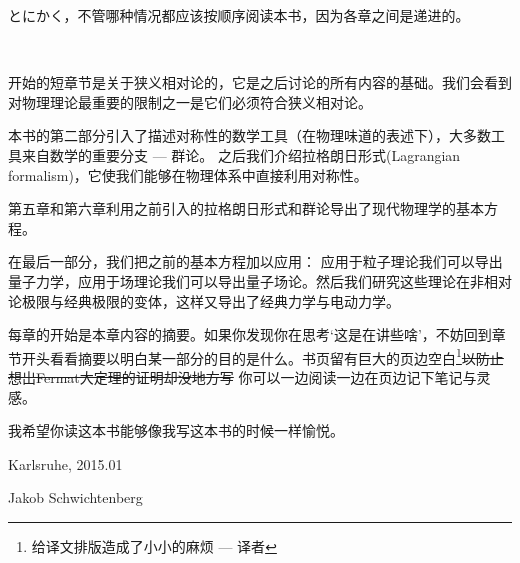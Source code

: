 とにかく，不管哪种情况都应该按顺序阅读本书，因为各章之间是递进的。

\ 

开始的短章节是关于狭义相对论的，它是之后讨论的所有内容的基础。我们会看到对物理理论最重要的限制之一是它们必须符合狭义相对论。 

本书的第二部分引入了描述对称性的数学工具（在物理味道的表述下），大多数工具来自数学的重要分支 --- 群论。 之后我们介绍拉格朗日形式(Lagrangian formalism)，它使我们能够在物理体系中直接利用对称性。 

第五章和第六章利用之前引入的拉格朗日形式和群论导出了现代物理学的基本方程。

在最后一部分，我们把之前的基本方程加以应用： %
应用于粒子理论我们可以导出量子力学，应用于场理论我们可以导出量子场论。然后我们研究这些理论在非相对论极限与经典极限的变体，这样又导出了经典力学与电动力学。

每章的开始是本章内容的摘要。如果你发现你在思考`这是在讲些啥'，不妨回到章节开头看看摘要以明白某一部分的目的是什么。书页留有巨大的页边空白\footnote{给译文排版造成了小小的麻烦 --- 译者}\sout{以防止想出Fermat大定理的证明却没地方写}
你可以一边阅读一边在页边记下笔记与灵感。

我希望你读这本书能够像我写这本书的时候一样愉悦。

\begin{flushright}
Karlsruhe, 2015.01

Jakob Schwichtenberg
\end{flushright}
